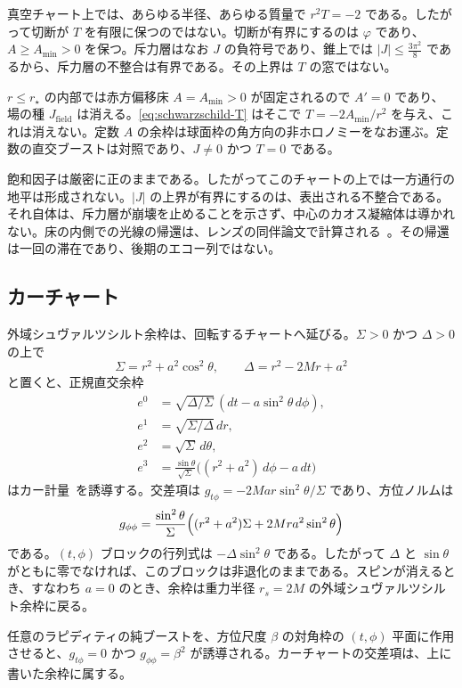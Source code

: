 \documentclass[a4paper]{article}
\newcommand{\Jbound}{\frac{3\pi^2}{8}}
\begin{document}
真空チャート上では、あらゆる半径、あらゆる質量で $r^2 T=-2$ である。したがって切断が $T$ を有限に保つのではない。切断が有界にするのは $\varphi$ であり、$A\ge A_{\min}>0$ を保つ。斥力層はなお $J$ の負符号であり、錐上では $|J|\le\Jbound$ であるから、斥力層の不整合は有界である。その上界は $T$ の窓ではない。

$r\le r_\star$ の内部では赤方偏移床 $A=A_{\min}>0$ が固定されるので $A'=0$ であり、場の種 $J_{\mathrm{field}}$ は消える。\eqref{eq:schwarzschild-T} はそこで $T=-2A_{\min}/r^2$ を与え、これは消えない。定数 $A$ の余枠は球面枠の角方向の非ホロノミーをなお運ぶ。定数の直交ブーストは対照であり、$J\neq 0$ かつ $T=0$ である。

飽和因子は厳密に正のままである。したがってこのチャートの上では一方通行の地平は形成されない。\(|J|\) の上界が有界にするのは、表出される不整合である。それ自体は、斥力層が崩壊を止めることを示さず、中心のカオス凝縮体は導かれない。床の内側での光線の帰還は、レンズの同伴論文で計算される~\cite{dst-lensing}。その帰還は一回の滞在であり、後期のエコー列ではない。

\subsection{カーチャート}
\label{subsec:kerr}

外域シュヴァルツシルト余枠は、回転するチャートへ延びる。$\Sigma>0$ かつ $\Delta>0$ の上で
\[
\Sigma=r^2+a^2\cos^2\theta,\qquad\Delta=r^2-2Mr+a^2
\]
と置くと、正規直交余枠
\begin{align*}
e^0&=\sqrt{\Delta/\Sigma}\,(dt-a\sin^2\theta\,d\phi),\\
e^1&=\sqrt{\Sigma/\Delta}\,dr,\\
e^2&=\sqrt{\Sigma}\,d\theta,\\
e^3&=\frac{\sin\theta}{\sqrt{\Sigma}}\bigl((r^2+a^2)\,d\phi-a\,dt\bigr)
\end{align*}
はカー計量~\cite{kerr1963}を誘導する。交差項は $g_{t\phi}=-2Mar\sin^2\theta/\Sigma$ であり、方位ノルムは
\[
g_{\phi\phi}=\frac{\sin^2\theta}{\Sigma}\Bigl((r^2+a^2)\Sigma+2Mra^2\sin^2\theta\Bigr)
\]
である。$(t,\phi)$ ブロックの行列式は $-\Delta\sin^2\theta$ である。したがって $\Delta$ と $\sin\theta$ がともに零でなければ、このブロックは非退化のままである。スピンが消えるとき、すなわち $a=0$ のとき、余枠は重力半径 $r_s=2M$ の外域シュヴァルツシルト余枠に戻る。

任意のラピディティの純ブーストを、方位尺度 $\beta$ の対角枠の $(t,\phi)$ 平面に作用させると、$g_{t\phi}=0$ かつ $g_{\phi\phi}=\beta^2$ が誘導される。カーチャートの交差項は、上に書いた余枠に属する。
\end{document}
